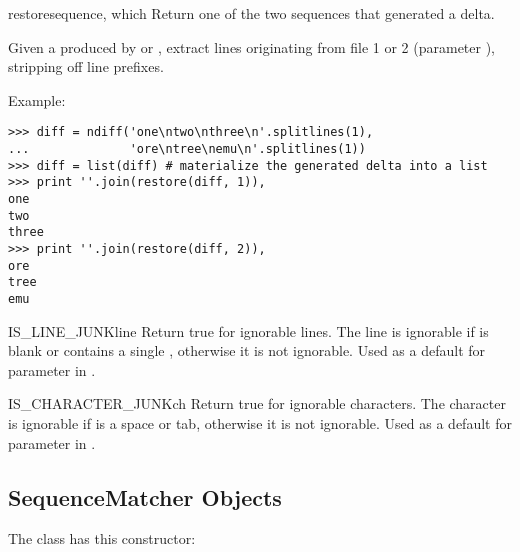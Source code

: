 \begin{funcdesc}{restore}{sequence, which}
  Return one of the two sequences that generated a delta.

  Given a  produced by  or
  , extract lines originating from file 1 or 2
  (parameter ), stripping off line prefixes.

  Example:

\begin{verbatim}
>>> diff = ndiff('one\ntwo\nthree\n'.splitlines(1),
...              'ore\ntree\nemu\n'.splitlines(1))
>>> diff = list(diff) # materialize the generated delta into a list
>>> print ''.join(restore(diff, 1)),
one
two
three
>>> print ''.join(restore(diff, 2)),
ore
tree
emu
\end{verbatim}

\end{funcdesc}


\begin{funcdesc}{IS_LINE_JUNK}{line}
  Return true for ignorable lines.  The line  is ignorable
  if  is blank or contains a single \character{\#},
  otherwise it is not ignorable.  Used as a default for parameter
   in .
\end{funcdesc}


\begin{funcdesc}{IS_CHARACTER_JUNK}{ch}
  Return true for ignorable characters.  The character  is
  ignorable if  is a space or tab, otherwise it is not
  ignorable.  Used as a default for parameter  in
  .
\end{funcdesc}


\begin{seealso}
\end{seealso}


\subsection{SequenceMatcher Objects \label{sequence-matcher}}

The  class has this constructor:


